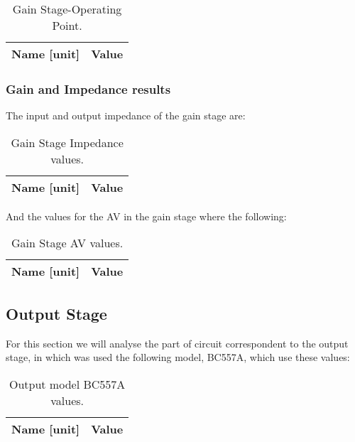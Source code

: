 \begin{table}[H]
	\centering
	\begin{tabular}{|l|r|}
		\hline    
		{\bf Name [unit]} & {\bf Value} \\ \hline
		
	\end{tabular}
	\caption{Gain Stage-Operating Point.}
	\label{tab:teo}
\end{table}

\subsubsection{Gain and Impedance results}

The input and output impedance of the gain stage are:\par

\begin{table}[H]
	\centering
	\begin{tabular}{|l|r|}
		\hline    
		{\bf Name [unit]} & {\bf Value} \\ \hline
		
	\end{tabular}
	\caption{Gain Stage Impedance values.}
	\label{tab:teo}
\end{table}

And the values for the AV in the gain stage where the following:

\begin{table}[H]
	\centering
	\begin{tabular}{|l|r|}
		\hline    
		{\bf Name [unit]} & {\bf Value} \\ \hline
		
	\end{tabular}
	\caption{Gain Stage AV values.}
	\label{tab:teo}
\end{table}

\subsection{Output Stage}

For this section we will analyse the part of circuit correspondent to the output stage, in which was used the following model, BC557A, which use these values:


\begin{table}[H]
	\centering
	\begin{tabular}{|l|r|}
		\hline    
		{\bf Name [unit]} & {\bf Value} \\ \hline
		
	\end{tabular}
	\caption{Output model BC557A values.}
	\label{tab:teo}
\end{table}

